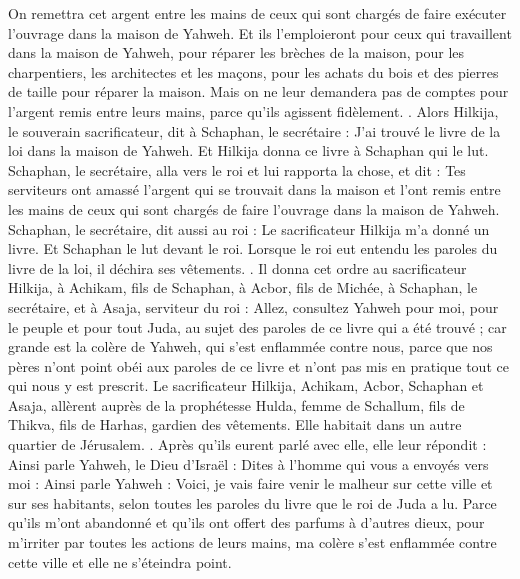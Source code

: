 \begin{multicols}{2}
On remettra cet argent entre les mains de ceux qui sont chargés de faire exécuter l'ouvrage dans la maison de Yahweh. Et ils l'emploieront pour ceux qui travaillent dans la maison de Yahweh, pour réparer les brèches de la maison,
pour les charpentiers, les architectes et les maçons, pour les achats du bois et des pierres de taille pour réparer la maison.
Mais on ne leur demandera pas de comptes pour l'argent remis entre leurs mains, parce qu'ils agissent fidèlement.
.
Alors Hilkija, le souverain sacrificateur, dit à Schaphan, le secrétaire : J'ai trouvé le livre de la loi dans la maison de Yahweh. Et Hilkija donna ce livre à Schaphan qui le lut.
Schaphan, le secrétaire, alla vers le roi et lui rapporta la chose, et dit : Tes serviteurs ont amassé l'argent qui se trouvait dans la maison et l'ont remis entre les mains de ceux qui sont chargés de faire l'ouvrage dans la maison de Yahweh.
Schaphan, le secrétaire, dit aussi au roi : Le sacrificateur Hilkija m'a donné un livre. Et Schaphan le lut devant le roi.
Lorsque le roi eut entendu les paroles du livre de la loi, il déchira ses vêtements.
.
Il donna cet ordre au sacrificateur Hilkija, à Achikam, fils de Schaphan, à Acbor, fils de Michée, à Schaphan, le secrétaire, et à Asaja, serviteur du roi :
Allez, consultez Yahweh pour moi, pour le peuple et pour tout Juda, au sujet des paroles de ce livre qui a été trouvé ; car grande est la colère de Yahweh, qui s'est enflammée contre nous, parce que nos pères n'ont point obéi aux paroles de ce livre et n'ont pas mis en pratique tout ce qui nous y est prescrit.
Le sacrificateur Hilkija, Achikam, Acbor, Schaphan et Asaja, allèrent auprès de la prophétesse Hulda, femme de Schallum, fils de Thikva, fils de Harhas, gardien des vêtements. Elle habitait dans un autre quartier de Jérusalem.
.
Après qu'ils eurent parlé avec elle, elle leur répondit : Ainsi parle Yahweh, le Dieu d'Israël : Dites à l'homme qui vous a envoyés vers moi :
Ainsi parle Yahweh : Voici, je vais faire venir le malheur sur cette ville et sur ses habitants, selon toutes les paroles du livre que le roi de Juda a lu.
Parce qu'ils m'ont abandonné et qu'ils ont offert des parfums à d'autres dieux, pour m'irriter par toutes les actions de leurs mains, ma colère s'est enflammée contre cette ville et elle ne s'éteindra point.

\end{multicols}
